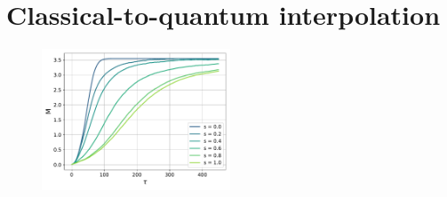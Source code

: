 \section{Classical-to-quantum interpolation}

\label{sec:classical_to_quantum}

\begin{figure}
    \centering
    \includegraphics[width=0.5\textwidth]{figures/slide_broken/thermalisation.pdf}
    \caption{}
    \label{fig:thermalisation_different_noise_fracs}
\end{figure}

